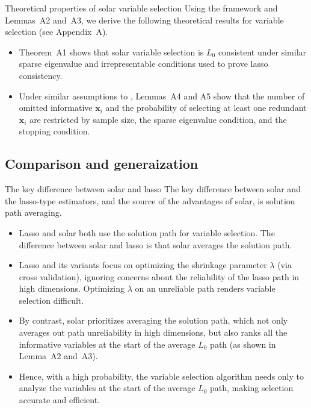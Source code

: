 \documentclass{beamer}
\begin{document}
\begin{frame}{Theoretical properties of solar variable selection}
  Using the \citet{zhang09} framework and Lemmas~A2 and~A3, we derive the following theoretical results for variable selection (see Appendix~A).

  \begin{itemize}
    \item Theorem~A1 shows that solar variable selection is $L_0$ consistent under similar sparse eigenvalue and irrepresentable conditions used to prove lasso consistency.
    \item Under similar assumptions to \citet{zhang09}, Lemmas~A4 and A5 show that the number of omitted informative $\mathbf{x}_i$ and the probability of selecting at least one redundant $\mathbf{x}_i$ are restricted by sample size, the sparse eigenvalue condition, and the stopping condition.
  \end{itemize}
\end{frame}

\subsection{Comparison and generaization}

\begin{frame}{The key difference between solar and lasso}
  The key difference between solar and the lasso-type estimators, and the source of the advantages of solar, is solution path averaging.
  \begin{itemize}
    \item Lasso and solar both use the solution path for variable selection. The difference between solar and lasso is that solar averages the solution path. 
    
    \item Lasso and its variants focus on optimizing the shrinkage parameter $\lambda$ (via cross validation), ignoring concerns about the reliability of the lasso path in high dimensions. Optimizing $\lambda$ on an unreliable path renders variable selection difficult. 
    
    \item By contrast, solar prioritizes averaging the solution path, which not only averages out  path unreliability in high dimensions, but also ranks all the informative variables at the start of the average $L_0$ path (as shown in Lemma~A2 and~A3). 
    
    \item Hence, with a high probability, the variable selection algorithm needs only to analyze the variables at the start of the average $L_0$ path, making selection accurate and efficient.
  \end{itemize}
\end{frame}
\end{document}

